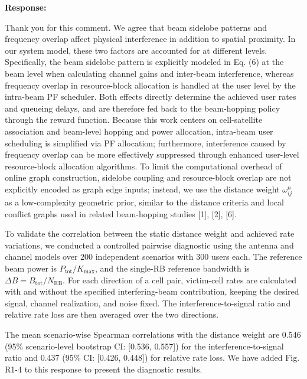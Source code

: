 \documentclass[11pt,a4paper]{article}
\newcommand{\qrev}[1]{{\color{qinrev}#1}}
\begin{document}
\textbf{Response:}\par

Thank you for this comment. We agree that beam sidelobe patterns and frequency overlap affect physical interference in addition to spatial proximity. In our system model, these two factors are accounted for at different levels. Specifically, the beam sidelobe pattern is explicitly modeled in Eq. (6) at the beam level when calculating channel gains and inter-beam interference, whereas frequency overlap in resource-block allocation is handled at the user level by the intra-beam PF scheduler. Both effects directly determine the achieved user rates and queueing delays, and are therefore fed back to the beam-hopping policy through the reward function. Because this work centers on cell-satellite association and beam-level hopping and power allocation, intra-beam user scheduling is simplified via PF allocation; furthermore, interference caused by frequency overlap can be more effectively suppressed through enhanced user-level resource-block allocation algorithms. To limit the computational overhead of online graph construction, sidelobe coupling and resource-block overlap are not explicitly encoded as graph edge inputs; instead, we use the distance weight $\omega_{ij}^n$ as a low-complexity geometric prior, similar to the distance criteria and local conflict graphs used in related beam-hopping studies [1], [2], [6].
\par

To validate the correlation between the static distance weight and achieved rate variations, \qrev{we conducted a controlled pairwise diagnostic} using the antenna and channel models over 200 independent scenarios with 300 users each. The reference beam power is $P_{\mathrm{tot}}/K_{\max}$, and the single-RB reference bandwidth is $\Delta B=B_{\mathrm{tot}}/N_{\mathrm{RB}}$. For each direction of a cell pair, victim-cell rates are calculated with and without the specified interfering-beam contribution, keeping the desired signal, channel realization, and noise fixed. The interference-to-signal ratio and relative rate loss are then averaged over the two directions.
\par

The mean scenario-wise Spearman correlations with the distance weight are 0.546 (95\% scenario-level bootstrap CI: [0.536, 0.557]) for the interference-to-signal ratio and 0.437 (95\% CI: [0.426, 0.448]) for relative rate loss. We have added Fig. R1-4 to this response to present the diagnostic results.
\par
\end{document}
